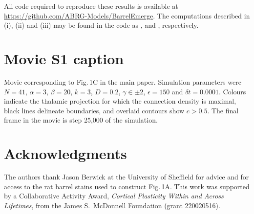 \documentclass[9pt,lineno]{elife}
\begin{document}
All code required to reproduce these results is available at
\url{https://github.com/ABRG-Models/BarrelEmerge}. The computations described
in (i), (ii) and (iii) may be found in the code  as
,  and , respectively.

\section{Movie S1 caption}

Movie corresponding to Fig.\,1C in the main paper. Simulation parameters were
$N=41$, $\alpha=3$, $\beta=20$, $k=3$, $D=0.2$, $\gamma\in\pm 2$,
$\epsilon=150$ and $\delta{t}=0.0001$. Colours indicate the thalamic
projection for which the connection density is maximal, black lines delineate
boundaries, and overlaid contours show $c>0.5$. The final frame in the movie
is step 25,000 of the simulation.

\section{Acknowledgments}

The authors thank Jason Berwick at the University of Sheffield for advice and
for access to the rat barrel stains used to construct Fig.\,1A. This work was
supported by a Collaborative Activity Award, \emph{Cortical Plasticity Within
  and Across Lifetimes}, from the James S.~McDonnell Foundation (grant
220020516).


\end{document}
